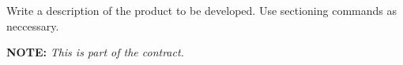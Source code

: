 
Write a description of the product to be developed.
Use sectioning commands as neccessary.
\vspace{2\baselineskip}

\centerline{\Large {\bf NOTE:} {\em This is part of the contract.}}


